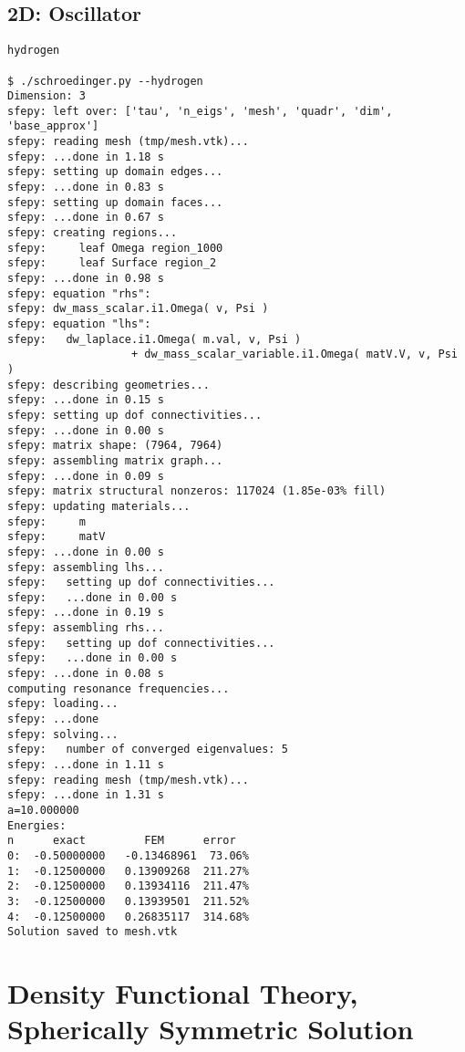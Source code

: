 \subsection{2D: Oscillator}

\begin{lstlisting}
hydrogen

$ ./schroedinger.py --hydrogen
Dimension: 3
sfepy: left over: ['tau', 'n_eigs', 'mesh', 'quadr', 'dim', 'base_approx']
sfepy: reading mesh (tmp/mesh.vtk)...
sfepy: ...done in 1.18 s
sfepy: setting up domain edges...
sfepy: ...done in 0.83 s
sfepy: setting up domain faces...
sfepy: ...done in 0.67 s
sfepy: creating regions...
sfepy:     leaf Omega region_1000
sfepy:     leaf Surface region_2
sfepy: ...done in 0.98 s
sfepy: equation "rhs":
sfepy: dw_mass_scalar.i1.Omega( v, Psi )
sfepy: equation "lhs":
sfepy:   dw_laplace.i1.Omega( m.val, v, Psi )
                   + dw_mass_scalar_variable.i1.Omega( matV.V, v, Psi )
sfepy: describing geometries...
sfepy: ...done in 0.15 s
sfepy: setting up dof connectivities...
sfepy: ...done in 0.00 s
sfepy: matrix shape: (7964, 7964)
sfepy: assembling matrix graph...
sfepy: ...done in 0.09 s
sfepy: matrix structural nonzeros: 117024 (1.85e-03% fill)
sfepy: updating materials...
sfepy:     m
sfepy:     matV
sfepy: ...done in 0.00 s
sfepy: assembling lhs...
sfepy:   setting up dof connectivities...
sfepy:   ...done in 0.00 s
sfepy: ...done in 0.19 s
sfepy: assembling rhs...
sfepy:   setting up dof connectivities...
sfepy:   ...done in 0.00 s
sfepy: ...done in 0.08 s
computing resonance frequencies...
sfepy: loading...
sfepy: ...done
sfepy: solving...
sfepy:   number of converged eigenvalues: 5
sfepy: ...done in 1.11 s
sfepy: reading mesh (tmp/mesh.vtk)...
sfepy: ...done in 1.31 s
a=10.000000
Energies:
n      exact         FEM      error
0:  -0.50000000   -0.13468961  73.06%
1:  -0.12500000   0.13909268  211.27%
2:  -0.12500000   0.13934116  211.47%
3:  -0.12500000   0.13939501  211.52%
4:  -0.12500000   0.26835117  314.68%
Solution saved to mesh.vtk
\end{lstlisting}

\section{Density Functional Theory, Spherically Symmetric Solution}
